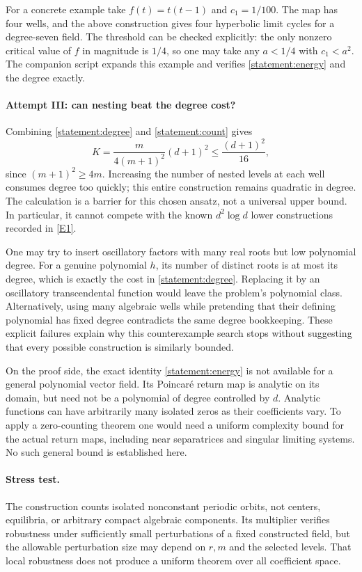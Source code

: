 \documentclass[11pt,a4paper]{article}
\newcommand{\eref}[2]{\hyperlink{extra:#1:#2}{[E#2]}}
\numberwithin{equation}{section}
\begin{document}
For a concrete example take $f(t)=t(t-1)$ and $c_1=1/100$.
The map has four wells, and the above construction gives four hyperbolic
limit cycles for a degree-seven field.  The threshold can be checked
explicitly: the only nonzero critical value of $f$ in magnitude is
$1/4$, so one may take any $a<1/4$ with $c_1<a^2$.
The companion script expands this example and verifies
\eqref{statement:energy} and the degree exactly.

\paragraph{Attempt III: can nesting beat the degree cost?}
Combining \eqref{statement:degree} and \eqref{statement:count} gives
\[
 K=\frac{m}{4(m+1)^2}(d+1)^2
       \leq\frac{(d+1)^2}{16},
\]
since $(m+1)^2\geq4m$.  Increasing the number of nested levels at each
well consumes degree too quickly; this entire construction remains
quadratic in degree.  The calculation is a barrier for this chosen
ansatz, not a universal upper bound.  In particular, it cannot compete
with the known $d^2\log d$ lower constructions recorded in
\eref{statement}{1}.

One may try to insert oscillatory factors with many real roots but low
polynomial degree.  For a genuine polynomial $h$, its number of distinct
roots is at most its degree, which is exactly the cost in
\eqref{statement:degree}.  Replacing it by an oscillatory transcendental
function would leave the problem's polynomial class.  Alternatively,
using many algebraic wells while pretending that their defining
polynomial has fixed degree contradicts the same degree bookkeeping.
These explicit failures explain why this counterexample search stops
without suggesting that every possible construction is similarly bounded.

On the proof side, the exact identity \eqref{statement:energy} is not available
for a general polynomial vector field.  Its Poincar\'e return map is
analytic on its domain, but need not be a polynomial of degree controlled
by $d$.  Analytic functions can have arbitrarily many isolated zeros as
their coefficients vary.  To apply a zero-counting theorem one would
need a uniform complexity bound for the actual return maps, including
near separatrices and singular limiting systems.  No such general bound
is established here.

\paragraph{Stress test.}
The construction counts isolated nonconstant periodic orbits, not
centers, equilibria, or arbitrary compact algebraic components.  Its
multiplier verifies robustness under sufficiently small perturbations
of a fixed constructed field, but the allowable perturbation size may
depend on $r,m$ and the selected levels.  That local robustness does not
produce a uniform theorem over all coefficient space.
\end{document}
